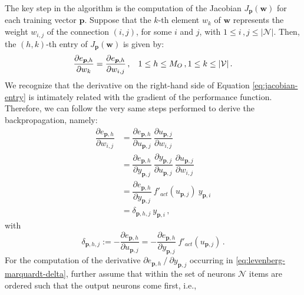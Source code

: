 \documentclass[12pt, a4paper, twoside, openright]{report}
\numberwithin{equation}{chapter}
\theoremstyle{theorem}
\theoremstyle{definition}
\theoremstyle{remark}
\theoremstyle{proposition}
\numberwithin{figure}{chapter}
\begin{document}
		The key step in the algorithm is the computation of the Jacobian $J_{\boldsymbol{p}}(\boldsymbol{w})$ for each training vector $\boldsymbol{p}$. Suppose that the $k$-th element $w_k$ of $\boldsymbol{w}$ represents the weight $w_{i,j}$ of the connection $(i,j)$, for some $i$ and $j$, with $1 \leq i \, , j \leq |\mathcal{N}|$. Then, the $(h,k)$-th entry of $J_{\boldsymbol{p}}(\boldsymbol{w})$ is given by:
		\begin{equation}
			\label{eq:jacobian-entry}
			\dfrac{\partial e_{\boldsymbol{p},h}}{\partial w_k} = \dfrac{\partial e_{\boldsymbol{p},h}}{\partial w_{i,j}} \, , \hspace*{0.3cm} 1 \leq h \leq M_O \, , 1 \leq k \leq |\mathcal{V}| \, .
		\end{equation}
		We recognize that the derivative on the right-hand side of Equation \eqref{eq:jacobian-entry} is intimately related with the gradient of the performance function. Therefore, we can follow the very same steps performed to derive the backpropagation, namely:
		\begin{equation}
			\label{eq:jacobian-entry-equation}
			\begin{aligned}
				\dfrac{\partial e_{\boldsymbol{p},h}}{\partial w_{i,j}} & = \dfrac{\partial e_{\boldsymbol{p},h}}{\partial u_{\boldsymbol{p},j}} ~ \dfrac{\partial u_{\boldsymbol{p},j}}{\partial w_{i,j}} \\[0.1cm]
				& = \dfrac{\partial e_{\boldsymbol{p},h}}{\partial y_{\boldsymbol{p},j}} ~ \dfrac{\partial y_{\boldsymbol{p},j}}{\partial u_{\boldsymbol{p},j}} ~ \dfrac{\partial u_{\boldsymbol{p},j}}{\partial w_{i,j}} \\[0.1cm]
				& = \dfrac{\partial e_{\boldsymbol{p},h}}{\partial y_{\boldsymbol{p},j}} ~ f'_{act}(u_{\boldsymbol{p},j}) ~ y_{\boldsymbol{p},i} \\
				& = \delta_{\boldsymbol{p},h,j} ~ y_{\boldsymbol{p},i} \, ,
			\end{aligned}
		\end{equation} 
		with
		\begin{equation}
			\label{eq:levenberg-marquardt-delta}
			\delta_{\boldsymbol{p},h,j} := - \dfrac{\partial e_{\boldsymbol{p},h}}{\partial u_{\boldsymbol{p},j}} = - \dfrac{\partial e_{\boldsymbol{p},h}}{\partial y_{\boldsymbol{p},j}} ~ f'_{act}(u_{\boldsymbol{p},j}) \, .
		\end{equation}
		For the computation of the derivative $\partial e_{\boldsymbol{p},h} ~ / ~ \partial y_{\boldsymbol{p},j}$ occurring in \eqref{eq:levenberg-marquardt-delta}, further assume that within the set of neurons $\mathcal{N}$ items are ordered such that the output neurons come first, i.e.,
\end{document}
